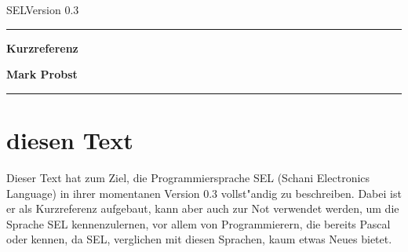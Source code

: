 


\addtolength{\textwidth}{4cm}
\addtolength{\oddsidemargin}{-1.7cm}
\addtolength{\evensidemargin}{-1.7cm}
\addtolength{\topmargin}{-80pt}
\addtolength{\textheight}{150pt}
\addtolength{\marginparsep}{-5pt}


\setcounter{secnumdepth}{3}
\setcounter{tocdepth}{3}

\sloppy
\frenchspacing
\makeindex





\begin{titlepage}
\vspace*{2cm}
\begin{flushleft}
\inch SEL\rm \hfill Version 0.3
\end{flushleft}
\rule{\textwidth}{2mm}
\begin{flushright}
\huge{\bf Kurzreferenz}\\[0.5ex]
\end{flushright}
\vspace{13.5cm}
\begin{flushleft}
\large \bf Mark Probst\\
\rule[2mm]{\textwidth}{1mm}
\end{flushleft}
\end{titlepage}

\tableofcontents

\newpage

\chapter{ diesen Text}

Dieser Text hat zum Ziel, die Programmiersprache SEL (Schani
Electronics Language) in ihrer momentanen Version 0.3
vollst"andig zu beschreiben. Dabei ist er als Kurzreferenz
aufgebaut, kann aber auch zur Not verwendet werden, um die
Sprache SEL kennenzulernen, vor allem von Programmierern, die
bereits {\sc Pascal}
oder 
kennen, da SEL, verglichen mit diesen Sprachen, kaum etwas Neues
bietet.

